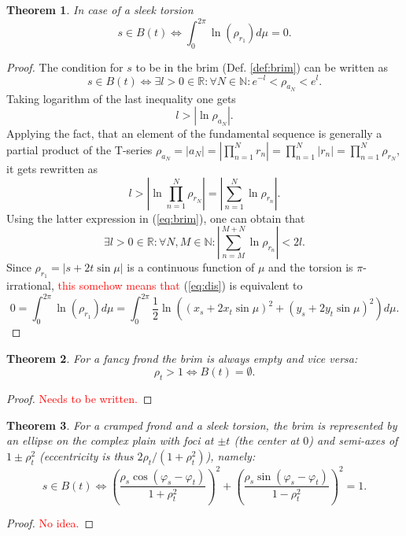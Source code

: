 \documentclass{article}
\newcommand{\be}{\begin{equation}}
\newcommand{\ee}{\end{equation}}
\newcommand{\red}[1]{\textcolor{red}{#1}}
\theoremstyle{plain}
\newtheorem{theorem}{Theorem}[section]
\theoremstyle{definition}
\begin{document}
\begin{theorem}\label{th:intbrim}
In case of a sleek torsion
$$s \in B(t) \Leftrightarrow 
\int_0^{2\pi} \ln (\rho_{r_1}) d\mu = 0 .$$
\end{theorem}
\begin{proof}
The condition for $s$ to be in the brim (Def. \ref{def:brim}) can be written as \be\label{eq:brim}
s \in B(t) \Leftrightarrow \exists  l>0 \in \mathbb R : \forall N \in \mathbb N : e^{-l}<\rho_{ a_N}  < e^l
.\ee
Taking logarithm of the last inequality one gets $$
l>\left|\ln\rho_{ a_N}  \right|. $$
Applying the fact, that an element of the fundamental sequence is generally a partial product of the T-series $\rho_{ a_N} =  \left|a_N \right|  = \left| \prod_{n=1}^{N} r_n \right| =\prod_{n=1}^{N}\left| r_n \right| =\prod_{n=1}^{N}\rho_{ r_N} $, it gets rewritten as $$
l>\left|\ln\prod_{n=1}^{N} \rho_{ r_N} \right| =  \left|\sum_{n=1}^{N}\ln\rho_{ r_n} \right|.$$
Using the latter expression in (\ref{eq:brim}), one can obtain that \be\label{eq:dis}
 \exists  l>0 \in \mathbb R : \forall N,M \in \mathbb N : \left|\sum_{n=M}^{M+N}\ln\rho_{ r_n} \right| < 2l.\ee
Since $ \rho_{r_1} = |s + 2t \sin\mu|$ is a continuous function of $\mu$  and the torsion is $\pi$-irrational, \red{this somehow means that} (\ref{eq:dis}) is equivalent to $$
0 =\int_0^{2\pi} \ln (\rho_{r_1}) d\mu = \int_0^{2\pi} \frac12 \ln\left((x_s+ 2x_t \sin\mu)^2+(y_s + 2y_t \sin\mu)^2\right)d\mu 
.$$
\end{proof}

\begin{theorem}
For a fancy frond the brim is always empty and vice versa:
$$\rho_t>1 \Leftrightarrow B(t) = \emptyset.$$
\end{theorem}
\begin{proof}
\red{Needs to be written.}
\end{proof}

\begin{theorem}
For a cramped frond and a sleek torsion, the brim is represented by an ellipse on the complex plain with foci at $\pm t$ (the center at $0$) and semi-axes of $1\pm\rho_t^2$ (eccentricity is thus $2\rho_t/(1+\rho_t^2)$), namely:
$$s \in B(t) \Leftrightarrow \left(\frac{\rho_s\cos(\varphi_s-\varphi_t)}{1+\rho_t^2}\right)^2 + \left(\frac{\rho_s\sin(\varphi_s-\varphi_t)}{1-\rho_t^2}\right)^2 = 1 .$$
\end{theorem}
\begin{proof}
\red{No idea.}
\end{proof}
\end{document}

